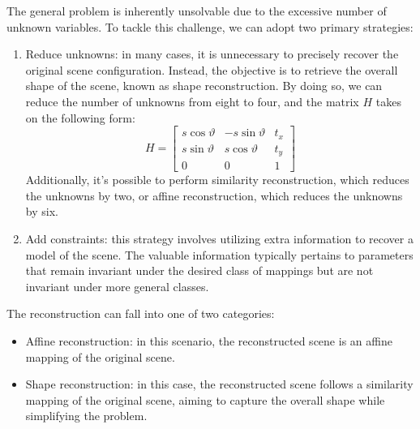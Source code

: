 \documentclass[12pt, a4paper]{report}
\begin{document}
    The general problem is inherently unsolvable due to the excessive number of unknown variables. 
    To tackle this challenge, we can adopt two primary strategies:
     
    \begin{enumerate}
        \item Reduce unknowns: in many cases, it is unnecessary to precisely recover the original scene configuration. 
            Instead, the objective is to retrieve the overall shape of the scene, known as shape reconstruction. 
            By doing so, we can reduce the number of unknowns from eight to four, and the matrix $H$ takes on the following form:
            \[H=    
            \begin{bmatrix}
                s\cos \vartheta & -s\sin \vartheta & t_x \\
                s\sin \vartheta & s\cos \vartheta & t_y \\
                0 & 0 & 1
            \end{bmatrix}\]
            Additionally, it's possible to perform similarity reconstruction, which reduces the unknowns by two, or affine reconstruction, which reduces the unknowns by six.
        \item Add constraints: this strategy involves utilizing extra information to recover a model of the scene. 
            The valuable information typically pertains to parameters that remain invariant under the desired class of mappings but are not invariant under more general classes.
    \end{enumerate}

    The reconstruction can fall into one of two categories:
    \begin{itemize}
        \item Affine reconstruction: in this scenario, the reconstructed scene is an affine mapping of the original scene.
        \item Shape reconstruction: in this case, the reconstructed scene follows a similarity mapping of the original scene, aiming to capture the overall shape while simplifying the problem.
    \end{itemize}
\end{document}
